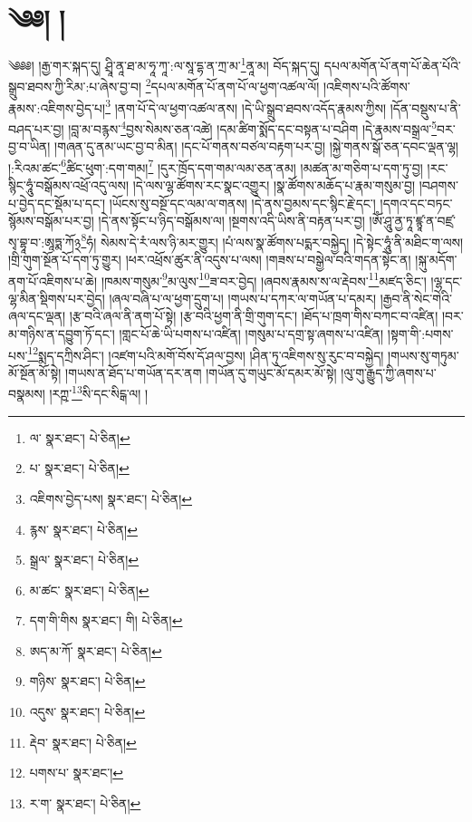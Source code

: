 \setcounter{footnote}{0} 
\chapter{༄༅། །}༄༅༅། །རྒྱ་གར་སྐད་དུ། ཤྲཱི་ནཱ་ཐ་མ་ཧཱ་ཀཱ་:ལ་སཱ་དྷ་ན་ཀྲ་མ་\footnote{ལ་  སྣར་ཐང་།  པེ་ཅིན། }ནཱ་མ། བོད་སྐད་དུ། དཔལ་མགོན་པོ་ནག་པོ་ཆེན་པོའི་སྒྲུབ་ཐབས་ཀྱི་རིམ་:པ་ཞེས་བྱ་བ། \footnote{པ་  སྣར་ཐང་།  པེ་ཅིན། }དཔལ་མགོན་པོ་ནག་པོ་ལ་ཕྱག་འཚལ་ལོ། །འཇིགས་པའི་ཚོགས་རྣམས་:འཇིགས་བྱེད་པ།\footnote{འཇིགས་བྱེད་པས།  སྣར་ཐང་།  པེ་ཅིན། } །ནག་པོ་དེ་ལ་ཕྱག་འཚལ་ནས། །དེ་ཡི་སྒྲུབ་ཐབས་འདོད་རྣམས་ཀྱིས། །དོན་བསྡུས་པ་ནི་བཤད་པར་བྱ། །བླ་མ་བརྙས་\footnote{རྙས་  སྣར་ཐང་།  པེ་ཅིན། }བྱས་སེམས་ཅན་འཚེ། །དམ་ཚིག་སྨོད་དང་བསྟན་པ་བཤིག །དེ་རྣམས་བསྒྲལ་\footnote{སྒྲལ་  སྣར་ཐང་།  པེ་ཅིན། }བར་བྱ་བ་ཡིན། །གཞན་དུ་ནམ་ཡང་བྱ་བ་མིན། །དང་པོ་གནས་བཙལ་བརྟག་པར་བྱ། །སྐྱེ་གནས་སྒོ་ཅན་དབང་ལྡན་ལྷ། །:རིའམ་ཚང་\footnote{མ་ཚང་  སྣར་ཐང་།  པེ་ཅིན། }ཚིང་ཕུག་:དག་གམ།\footnote{དག་གི་གིས  སྣར་ཐང་། གི།  པེ་ཅིན། } །དུར་ཁྲོད་དག་གམ་ལམ་ཅན་ནམ། །མཚན་མ་གཅིག་པ་དག་ཏུ་བྱ། །རང་སྙིང་ཧཱུཾ་བསྒོམས་འཕྲོ་འདུ་ལས། །དེ་ལས་ལྷ་ཚོགས་རང་སྣང་འགྱུར། །སྣ་ཚོགས་མཆོད་པ་རྣམ་གསུམ་བྱ། །བཤགས་པ་བྱེད་དང་སྡོམ་པ་དང་། །ཡོངས་སུ་བསྔོ་དང་ལམ་ལ་གནས། །དེ་ནས་བྱམས་དང་སྙིང་རྗེ་དང་། །དགའ་དང་བཏང་སྙོམས་བསྒོམ་པར་བྱ། །དེ་ནས་སྟོང་པ་ཉིད་བསྒོམས་ལ། །སྔགས་འདི་ཡིས་ནི་བརྟན་པར་བྱ། །ཨོཾ་ཤཱུ་ནྱ་ཏཱ་ཛྙཱ་ན་བཛྲ་སྭ་བྷཱ་བ་:ཨཱཏྨ་ཀོ྅\footnote{ཨད་མ་ཀོ་  སྣར་ཐང་།  པེ་ཅིན། }ཧཾ། སེམས་དེ་རཾ་ལས་ཉི་མར་གྱུར། །པཾ་ལས་སྣ་ཚོགས་པདྨར་བསྐྱེད། །དེ་སྟེང་ཧཱུཾ་ནི་མཐིང་ག་ལས། །གྲི་གུག་སྔོན་པོ་དག་ཏུ་གྱུར། །ཕར་འཕྲོས་ཚུར་ནི་འདུས་པ་ལས། །གཟས་པ་བསྒྱེལ་བའི་གདན་སྟེང་ན། །སྐུ་མདོག་ནག་པོ་འཇིགས་པ་ཆེ། །ཁམས་གསུམ་\footnote{གཉིས་  སྣར་ཐང་།  པེ་ཅིན། }མ་ལུས་\footnote{འདུས་  སྣར་ཐང་།  པེ་ཅིན། }ཟ་བར་བྱེད། །ཞབས་རྣམས་ས་ལ་རྡེབས་\footnote{རྡེབ་  སྣར་ཐང་།  པེ་ཅིན། }མཛད་ཅིང་། །ལྷ་དང་ལྷ་མིན་སྡིགས་པར་བྱེད། །ཞལ་བཞི་པ་ལ་ཕྱག་དྲུག་པ། །གཡས་པ་དཀར་ལ་གཡོན་པ་དམར། །རྒྱབ་ནི་སེང་གེའི་ཞལ་དང་ལྡན། །རྩ་བའི་ཞལ་ནི་ནག་པོ་སྟེ། །རྩ་བའི་ཕྱག་ནི་གྲི་གུག་དང་། །ཐོད་པ་ཁྲག་གིས་བཀང་བ་འཛིན། །བར་མ་གཉིས་ན་དབྱུག་ཏོ་དང་། །གླང་པོ་ཆེ་ཡི་པགས་པ་འཛིན། །གསུམ་པ་དགྲ་སྟ་ཞགས་པ་འཛིན། །སྟག་གི་:པགས་པས་\footnote{པགས་པ་  སྣར་ཐང་། }སྨད་དཀྲིས་ཤིང་། །འཛག་པའི་མགོ་བོས་དོ་ཤལ་བྱས། །ཤིན་ཏུ་འཇིགས་སུ་རུང་བ་བསྐྱེད། །གཡས་སུ་གཏུམ་མོ་སྔོན་མོ་སྟེ། །གཡས་ན་ཐོད་པ་གཡོན་དར་ནག །གཡོན་དུ་གཡུང་མོ་དམར་མོ་སྟེ། །ལུ་གུ་རྒྱུད་ཀྱི་ཞགས་པ་བསྣམས། །རཀྵ་\footnote{ར་ག་  སྣར་ཐང་།  པེ་ཅིན། }སི་དང་སིངྒ་ལ། །
